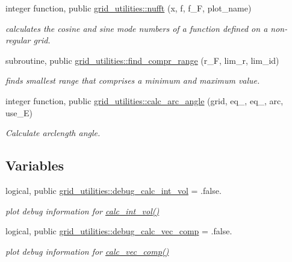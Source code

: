 \begin{DoxyCompactItemize}
integer function, public \hyperlink{namespacegrid__utilities_a0854b2d6cc61a31f68b4afe7304077a9}{grid\+\_\+utilities\+::nufft} (x, f, f\+\_\+F, plot\+\_\+name)
\begin{DoxyCompactList}\small\item\em calculates the cosine and sine mode numbers of a function defined on a non-\/regular grid. \end{DoxyCompactList}\item 
subroutine, public \hyperlink{namespacegrid__utilities_ae08e1ff213071c9d411a9b9c76035e1e}{grid\+\_\+utilities\+::find\+\_\+compr\+\_\+range} (r\+\_\+F, lim\+\_\+r, lim\+\_\+id)
\begin{DoxyCompactList}\small\item\em finds smallest range that comprises a minimum and maximum value. \end{DoxyCompactList}\item 
integer function, public \hyperlink{namespacegrid__utilities_ac32a26bff5c635678f3f78ec9a540a65}{grid\+\_\+utilities\+::calc\+\_\+arc\+\_\+angle} (grid, eq\+\_, eq\+\_, arc, use\+\_\+E)
\begin{DoxyCompactList}\small\item\em Calculate arclength angle. \end{DoxyCompactList}\end{DoxyCompactItemize}
\subsection*{Variables}
\begin{DoxyCompactItemize}
\item 
logical, public \hyperlink{namespacegrid__utilities_a0743c0341d508034b14aee614fa4f8a9}{grid\+\_\+utilities\+::debug\+\_\+calc\+\_\+int\+\_\+vol} = .false.
\begin{DoxyCompactList}\small\item\em plot debug information for \hyperlink{namespacegrid__utilities_a97e3106dbdc10b726af74afa113ba533}{calc\+\_\+int\+\_\+vol()} \end{DoxyCompactList}\item 
logical, public \hyperlink{namespacegrid__utilities_ab420036236dc8a9a69e180550499d95b}{grid\+\_\+utilities\+::debug\+\_\+calc\+\_\+vec\+\_\+comp} = .false.
\begin{DoxyCompactList}\small\item\em plot debug information for \hyperlink{namespacegrid__utilities_ad3d9386b9abcb1a7e17369a1b3a3750d}{calc\+\_\+vec\+\_\+comp()} \end{DoxyCompactList}\end{DoxyCompactItemize}
